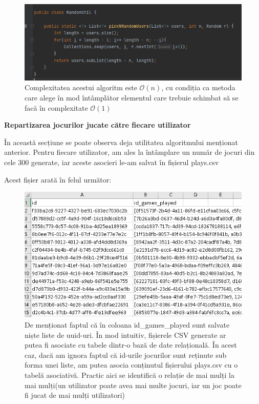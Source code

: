 \documentclass[12pt,a4paper]{report}
\begin{document}
\begin{figure}[H]
\centering
\caption{}
\begin{adjustbox}{max size={\textwidth}{\textheight}}
\includegraphics[scale = 0.8]{exemplu_11_random}
\end{adjustbox}
\caption*{Complexitatea acestui algoritm este \(\mathcal{O}(n) \), cu condiția ca metoda care alege în mod întâmplător elementul care trebuie schimbat să se facă în complexitate \(\mathcal{O}(1) \) }
\end{figure}

\bigskip
\textbf{Repartizarea jocurilor jucate către fiecare utilizator}
\bigskip

În această secțiune se poate observa deja utilitatea algoritmului menționat anterior. Pentru fiecare utilizator, am ales la întâmplare un număr de jocuri din cele 300 generate, iar aceste asocieri le-am salvat în fișierul plays.csv

Acest fișier arată în felul următor:

\begin{figure}[H]
\centering
\caption{}
\begin{adjustbox}{max size={\textwidth}{\textheight}}
\includegraphics[scale = 0.8]{exemplu_12_plays}
\end{adjustbox}
\caption*{De menționat faptul că în coloana id\_games\_played sunt salvate niște liste de uuid-uri. În mod intuitiv, fișierele CSV generate ar putea fi asociate cu tabele dintr-o bază de date relațională. În acest caz, dacă am ignora faptul că id-urile jocurilor sunt reținute sub forma unei liste, am putea asocia conținutul fișierului plays.csv cu o tabelă asociativă. Practic aici se identifică o relație de mai mulți la mai mulți(un utilizator poate avea mai multe jocuri, iar un joc poate fi jucat de mai mulți utilizatori) }
\end{figure}
\end{document}
